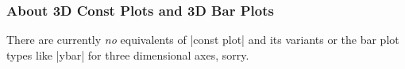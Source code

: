 \pgfplotsexpensiveexample
\begin{codeexample}[]
\end{codeexample}

\subsubsection{About 3D Const Plots and 3D Bar Plots}
There are currently \emph{no} equivalents of |const plot| and its variants or the bar plot types like |ybar| for three dimensional axes, sorry.

